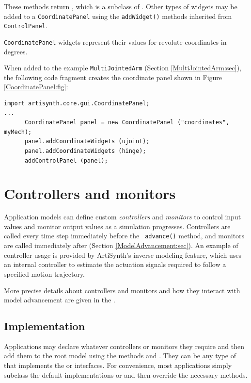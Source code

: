 These methods return 
, which is a subclass of
. Other types of
widgets may be added to a {\tt CoordinatePanel} using the {\tt addWidget()}
methods inherited from {\tt ControlPanel}.

\begin{sideblock}
{\tt CoordinatePanel} widgets represent their values for revolute coordinates
in degrees.
\end{sideblock}

When added to the example {\tt MultiJointedArm} (Section
\ref{MultiJointedArm:sec}), the following code fragment
creates the coordinate panel shown in Figure \ref{CoordinatePanel:fig}:

%
\begin{lstlisting}[]
import artisynth.core.gui.CoordinatePanel;
...
      CoordinatePanel panel = new CoordinatePanel ("coordinates", myMech);
      panel.addCoordinateWidgets (ujoint);
      panel.addCoordinateWidgets (hinge);
      addControlPanel (panel);
\end{lstlisting}
%




\section{Controllers and monitors}
\label{ControllersAndMonitors:sec}

Application models can define custom {\it controllers} and {\it monitors} to
control input values and monitor output values as a simulation
progresses. Controllers are called every time step immediately before the {\tt
advance()} method, and monitors are called immediately after
(Section \ref{ModelAdvancement:sec}).  An example of controller usage is
provided by ArtiSynth's inverse modeling feature, which uses an internal
controller to estimate the actuation signals required to follow a specified
motion trajectory.

More precise details about controllers and monitors and how they
interact with model advancement are given in the
.

\subsection{Implementation}
\label{ControllerImplementation:sec}

Applications may declare whatever controllers or monitors they require
and then add them to the root model using the methods
 and
.
They can be any type of
 that implements
the  or
 interfaces.  For
convenience, most applications simply subclass
the default implementations
 or
 and then override
the necessary methods.

